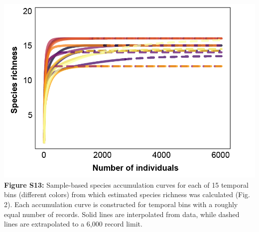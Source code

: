 \documentclass[11pt,]{article}
\begin{document}
\includegraphics[width=1\textwidth,height=\textheight]{../ms_figs/fig_s13.png}
\textbf{Figure S13:} Sample-based species accumulation curves for each
of 15 temporal bins (different colors) from which estimated species
richness was calculated (Fig. 2). Each accumulation curve is constructed
for temporal bins with a roughly equal number of records. Solid lines
are interpolated from data, while dashed lines are extrapolated to a
6,000 record limit. \clearpage

\newpage
\end{document}
